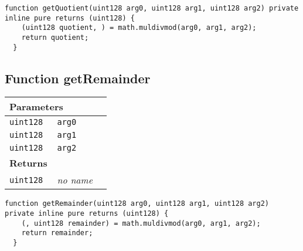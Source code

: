 \begin{lstlisting}[firstnumber=48]
  function getQuotient(uint128 arg0, uint128 arg1, uint128 arg2) private inline pure returns (uint128) {
    (uint128 quotient, ) = math.muldivmod(arg0, arg1, arg2);
    return quotient;
  }
\end{lstlisting}

\subsection{Function getRemainder}


\ifsoltables
\noindent\begin{tabular}{|l|l|p{5cm}|}\hline
\multicolumn{3}{|l|}{\bf Parameters}\\\hline
\tt uint128 & \tt arg0 &\\\hline
\tt uint128 & \tt arg1 &\\\hline
\tt uint128 & \tt arg2 &\\\hline
\multicolumn{3}{|l|}{\bf Returns}\\\hline
\tt uint128 & {\em no name} &\\\hline
\end{tabular}
\fi

\vspace{2cm}

\begin{lstlisting}[firstnumber=54]
  function getRemainder(uint128 arg0, uint128 arg1, uint128 arg2) private inline pure returns (uint128) {
    (, uint128 remainder) = math.muldivmod(arg0, arg1, arg2);
    return remainder;
  }
\end{lstlisting}
